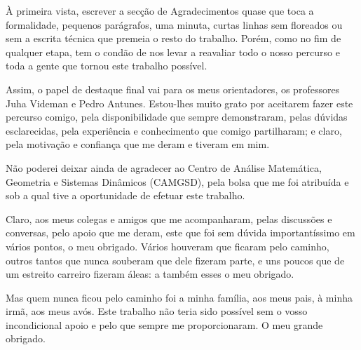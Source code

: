 À primeira vista, escrever a secção de Agradecimentos quase que toca a formalidade, pequenos parágrafos, uma minuta, curtas linhas sem floreados ou sem a escrita técnica que premeia o resto do trabalho. Porém, como no fim de qualquer etapa, tem o condão de nos levar a reavaliar todo o nosso percurso e toda a gente que tornou este trabalho possível.

Assim, o papel de destaque final vai para os meus orientadores, os professores Juha Videman e Pedro Antunes. Estou-lhes muito grato por aceitarem fazer este percurso comigo, pela disponibilidade que sempre demonstraram, pelas dúvidas esclarecidas, pela experiência e conhecimento que comigo partilharam; e claro, pela motivação e confiança que me deram e tiveram em mim.

Não poderei deixar ainda de agradecer ao Centro de Análise Matemática, Geometria e Sistemas Dinâmicos (CAMGSD), pela bolsa que me foi atribuída e sob a qual tive a oportunidade de efetuar este trabalho.

Claro, aos meus colegas e amigos que me acompanharam, pelas discussões e conversas, pelo apoio que me deram, este que foi sem dúvida importantíssimo em vários pontos, o meu obrigado. Vários houveram que ficaram pelo caminho, outros tantos que nunca souberam que dele fizeram parte, e uns poucos que de um estreito carreiro fizeram áleas: a também esses o meu obrigado.

Mas quem nunca ficou pelo caminho foi a minha família, aos meus pais, à minha irmã, aos meus avós. Este trabalho não teria sido possível sem o vosso incondicional apoio e pelo que sempre me proporcionaram. O meu grande obrigado.


